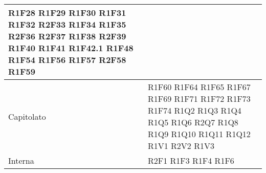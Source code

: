 \begin{center}
\begin{longtable}{|p{44mm}|p{22mm}|}
R1F28 \newline
R1F29 \newline
R1F30 \newline
R1F31 \newline
R1F32 \newline
R2F33 \newline
R1F34 \newline
R1F35 \newline
R2F36 \newline
R2F37 \newline
R1F38 \newline
R2F39 \newline
R1F40 \newline
R1F41 \newline
R1F42.1 \newline
R1F48 \newline
R1F54 \newline
R1F56 \newline
R1F57 \newline
R2F58 \newline
R1F59
\\
\hline
Capitolato &R1F60 \newline
R1F64 \newline
R1F65 \newline
R1F67 \newline
R1F69 \newline
R1F71 \newline
R1F72 \newline
R1F73 \newline
R1F74 \newline
R1Q2 \newline
R1Q3 \newline
R1Q4 \newline
R1Q5 \newline
R1Q6 \newline
R2Q7 \newline
R1Q8 \newline
R1Q9 \newline
R1Q10 \newline
R1Q11 \newline
R1Q12 \newline
R1V1 \newline
R2V2 \newline
R1V3 
\\
\hline
Interna &
R2F1 \newline
R1F3 \newline
R1F4 \newline
R1F6 \newline

\end{longtable}
\end{center}
